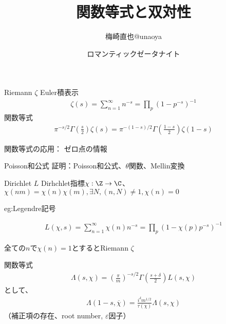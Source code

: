 \documentclass[dvipdfmx]{beamer}
\title{関数等式と双対性}
\author{梅崎直也@unaoya}
\date{ロマンティックゼータナイト}
\begin{document}
\begin{frame}
\maketitle
\end{frame}

\begin{frame}{Riemann $\zeta$}
  Euler積表示
  \begin{align*}
    \zeta(s)=\sum^{\infty}_{n=1}n^{-s}=\prod_p(1-p^{-s})^{-1}
  \end{align*}
  関数等式
  \begin{align*}
    \pi^{-s/2}\Gamma(\frac{s}{2})\zeta(s)=\pi^{-(1-s)/2}\Gamma(\frac{1-s}{2})\zeta(1-s)
  \end{align*}

  関数等式の応用：  ゼロ点の情報
\end{frame}

\begin{frame}{Poisson和公式}
  証明：Poisson和公式、$\theta$関数、Mellin変換
\end{frame}

\begin{frame}{Dirichlet $L$}
  Dirhchlet指標$\chi:\Z\to\C$、$\chi(nm)=\chi(n)\chi(m), \exists N, (n,N)\neq1, \chi(n)=0$

  eg:Legendre記号
  
  \begin{align*}
    L(\chi,s)=\sum^{\infty}_{n=1}\chi(n)n^{-s}=\prod_p(1-\chi(p)p^{-s})^{-1}
  \end{align*}

  全ての$n$で$\chi(n)=1$とするとRiemann $\zeta$
\end{frame}

\begin{frame}{関数等式}
  \begin{align*}
    \Lambda(s,\chi)=(\frac{\pi}{m})^{-s/2}\Gamma(\frac{s+\delta}{2})L(s,\chi)
  \end{align*}
  として、
  \begin{align*}
    \Lambda(1-s,\overline{\chi})=\frac{i^\delta m^{1/2}}{\tau(\chi)}\Lambda(s,\chi)
  \end{align*}
  （補正項の存在、root number, $\varepsilon$因子）
\end{frame}
\end{document}
